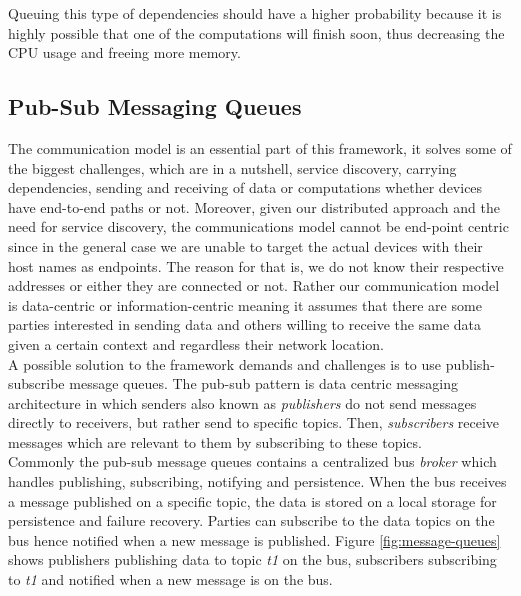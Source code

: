 \noindent Queuing this type of dependencies should have a higher probability because it is highly possible that one of the computations will finish soon, thus decreasing the CPU usage and freeing more memory. \\







\subsection{Pub-Sub Messaging Queues}\label{subsec:pub-sub}

The communication model is an essential part of this framework, it solves some of the biggest challenges, which are in a nutshell, service discovery, carrying dependencies, sending and receiving of data or computations whether devices have  end-to-end paths or not. Moreover, given our distributed approach and the need for service discovery, the communications model cannot be  end-point centric since in the general case we are unable to target the actual devices with their host names as endpoints. The reason for that is, we do not know their respective addresses or either they are connected or not. Rather our communication model is data-centric or information-centric meaning it assumes that there are some parties interested in sending data and others willing to receive the same data given a certain context and regardless their network location. \\

 

\noindent A possible solution to the framework demands and challenges is to use publish-subscribe message queues. The pub-sub pattern is data centric messaging architecture in which senders also known as \textit{publishers} do not send messages directly to receivers, but rather send to specific topics. Then, \textit{subscribers} receive messages which are relevant to them by subscribing to these topics. \\


\noindent Commonly the pub-sub message queues contains a centralized bus \textit{broker} which handles publishing, subscribing, notifying and persistence. 
When the bus receives a message published on a specific topic, the data is stored on a local storage for persistence and failure recovery. 
Parties can subscribe to the data topics on the  bus hence notified when a new message is published. Figure \ref{fig:message-queues} shows  publishers publishing data to topic \textit{t1} on the bus, subscribers subscribing to \textit{t1} and notified when a new message is on the bus.
	
